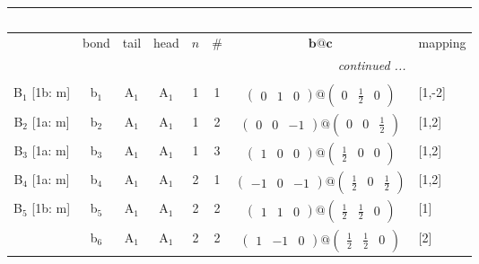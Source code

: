 \documentclass[fleqn,10pt,landscape]{article}
\begin{document}
\begin{itemize}
\begin{center}
\begin{longtable}{cc|cc|c|c|c|l}
\multicolumn{7}{l}{\tablename\ \thetable{}} \\
 \hline \hline
 & bond & tail & head & $n$ & \# & $\bm{b}@\bm{c}$ & mapping \\ \hline \endhead

 \hline \hline
\multicolumn{7}{r}{\footnotesize\it continued ...} \\ \endfoot

 \hline \hline
\multicolumn{7}{r}{} \\ \endlastfoot

B$_{1}$ [1b: m] & b$_{1}$ & A$_{1}$ & A$_{1}$ & 1 & 1 & $\begin{pmatrix} 0 & 1 & 0 \end{pmatrix}@\begin{pmatrix} 0 & \frac{1}{2} & 0 \end{pmatrix}$ & [1,-2] \\ \hline
B$_{2}$ [1a: m] & b$_{2}$ & A$_{1}$ & A$_{1}$ & 1 & 2 & $\begin{pmatrix} 0 & 0 & -1 \end{pmatrix}@\begin{pmatrix} 0 & 0 & \frac{1}{2} \end{pmatrix}$ & [1,2] \\ \hline
B$_{3}$ [1a: m] & b$_{3}$ & A$_{1}$ & A$_{1}$ & 1 & 3 & $\begin{pmatrix} 1 & 0 & 0 \end{pmatrix}@\begin{pmatrix} \frac{1}{2} & 0 & 0 \end{pmatrix}$ & [1,2] \\ \hline
B$_{4}$ [1a: m] & b$_{4}$ & A$_{1}$ & A$_{1}$ & 2 & 1 & $\begin{pmatrix} -1 & 0 & -1 \end{pmatrix}@\begin{pmatrix} \frac{1}{2} & 0 & \frac{1}{2} \end{pmatrix}$ & [1,2] \\ \hline
B$_{5}$ [1b: m] & b$_{5}$ & A$_{1}$ & A$_{1}$ & 2 & 2 & $\begin{pmatrix} 1 & 1 & 0 \end{pmatrix}@\begin{pmatrix} \frac{1}{2} & \frac{1}{2} & 0 \end{pmatrix}$ & [1] \\
& b$_{6}$ & A$_{1}$ & A$_{1}$ & 2 & 2 & $\begin{pmatrix} 1 & -1 & 0 \end{pmatrix}@\begin{pmatrix} \frac{1}{2} & \frac{1}{2} & 0 \end{pmatrix}$ & [2] \\ \hline

\end{longtable}
\end{center}
\end{itemize}
\end{document}
